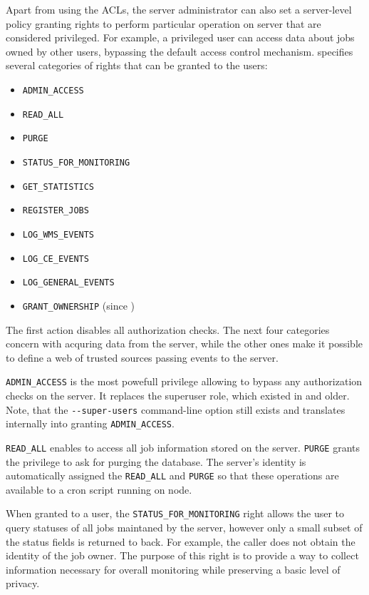 Apart from using the ACLs, the \LB server administrator can also set a
server-level policy granting rights to perform particular operation on \LB
server that are considered privileged.
For example, a privileged
user can access data about jobs owned by other users, bypassing the default
\LB access control mechanism.  specifies several categories of
rights that can be granted to the users:

\begin{itemize}
\item \verb'ADMIN_ACCESS'
\item \verb'READ_ALL'
\item \verb'PURGE'
\item \verb'STATUS_FOR_MONITORING'
\item \verb'GET_STATISTICS'
\item \verb'REGISTER_JOBS'
\item \verb'LOG_WMS_EVENTS'
\item \verb'LOG_CE_EVENTS'
\item \verb'LOG_GENERAL_EVENTS'
\item \verb'GRANT_OWNERSHIP' (since )
\end{itemize}

The first action disables all authorization checks. The next four categories concern with acquring data from the \LB
server, while the other ones make it possible to define a web of trusted sources
passing events to the \LB server.

\verb'ADMIN_ACCESS' is the most powefull privilege allowing to bypass any
authorization checks on the server. It replaces the superuser role, which
existed in  and older. Note, that the \verb'--super-users'
command-line option still exists and translates internally into granting
\verb'ADMIN_ACCESS'.

\verb'READ_ALL' enables to access all job information stored on the server.
\verb'PURGE' grants the privilege to ask for purging the \LB database.  The \LB
server's identity is automatically assigned the \verb'READ_ALL' and
\verb'PURGE' so that these operations are available \eg to a cron script
running on \LB node.

When granted to a user, the \verb'STATUS_FOR_MONITORING' right allows the user to
query statuses of all jobs maintaned by the server, however only a small
subset of the status fields is returned to back. For example, the caller
does not obtain the identity of the job owner. The purpose of this right is
to provide a way to collect information necessary for overall monitoring
while preserving a basic level of privacy.

